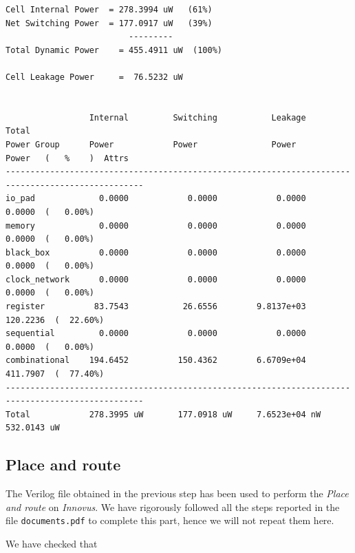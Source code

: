 \begin{Verbatim}[fontsize=\small]
Cell Internal Power  = 278.3994 uW   (61%)
Net Switching Power  = 177.0917 uW   (39%)
                         ---------
Total Dynamic Power    = 455.4911 uW  (100%)

Cell Leakage Power     =  76.5232 uW


                 Internal         Switching           Leakage            Total
Power Group      Power            Power               Power              Power   (   %    )  Attrs
--------------------------------------------------------------------------------------------------
io_pad             0.0000            0.0000            0.0000            0.0000  (   0.00%)
memory             0.0000            0.0000            0.0000            0.0000  (   0.00%)
black_box          0.0000            0.0000            0.0000            0.0000  (   0.00%)
clock_network      0.0000            0.0000            0.0000            0.0000  (   0.00%)
register          83.7543           26.6556        9.8137e+03          120.2236  (  22.60%)
sequential         0.0000            0.0000            0.0000            0.0000  (   0.00%)
combinational    194.6452          150.4362        6.6709e+04          411.7907  (  77.40%)
--------------------------------------------------------------------------------------------------
Total            278.3995 uW       177.0918 uW     7.6523e+04 nW       532.0143 uW
\end{Verbatim}

\subsection{Place and route}

The Verilog file obtained in the previous step has been used to perform the {\it Place and route} on {\it Innovus}. We have rigorously followed all the steps
reported in the file \verb|documents.pdf| to complete this part, hence we will not repeat them here.

We have checked that 